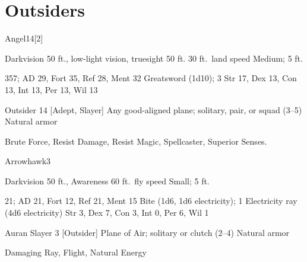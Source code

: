 \section{Outsiders}

    \begin{monsection}{Angel}{14}[2]
        \begin{spellcontent}
            \begin{spelltargetinginfo}
                \pari {} Darkvision 50 ft., low-light vision, truesight 50 ft.
                \pari {} 30 ft.\ land speed
                \pari {} Medium;  5 ft.
            \end{spelltargetinginfo}
            \begin{spelleffects}
                \pari {} 357;  AD 29, Fort 35, Ref 28, Ment 32
                \pari {} Greatsword  (1d10);  3
                \pari {} Str 17, Dex 13, Con 13, Int 13, Per 13, Wil 13
            \end{spelleffects}
        \end{spellcontent}
        \begin{spellfooter}
            \pari {} Outsider 14 [Adept, Slayer]
            \pari {} Any good-aligned plane; solitary, pair, or squad (3--5)
            \pari {} Natural armor 
        \end{spellfooter}
    \end{monsection}
     Brute Force, Resist Damage, Resist Magic, Spellcaster, Superior Senses.

    \begin{monsection}{Arrowhawk}{3}
        \begin{spellcontent}
            \begin{spelltargetinginfo}
                \pari {} Darkvision 50 ft., Awareness 
                \pari {} 60 ft.\ fly speed
                \pari {} Small;  5 ft.
            \end{spelltargetinginfo}
            \begin{spelleffects}
                \pari {} 21;  AD 21, Fort 12, Ref 21, Ment 15
                \pari {} Bite  (1d6, 1d6 electricity);  1
                \pari {} Electricity ray  (4d6 electricity)
                \pari {} Str 3, Dex 7, Con 3, Int 0, Per 6, Wil 1
            \end{spelleffects}
        \end{spellcontent}
        \begin{spellfooter}
            \pari {} Auran
            \pari {} Slayer 3 [Outsider]
            \pari {} Plane of Air; solitary or clutch (2--4)
            \pari {} Natural armor 
        \end{spellfooter}
    \end{monsection}
     Damaging Ray, Flight, Natural Energy


